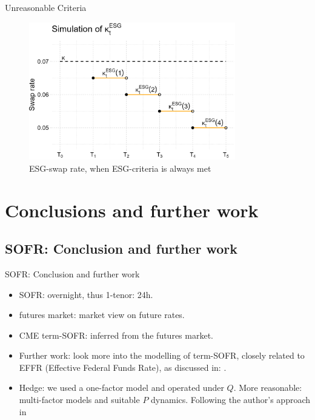 \documentclass[UKenglish]{beamer}
\begin{document}
\begin{frame}{Unreasonable Criteria}
\begin{figure}[htp]
    \centering
    \includegraphics[width= 9cm]{ESG/kappa_t_ESG_2.png}
    \caption{ESG-swap rate, when ESG-criteria is always met}
    \label{fig: ESG_swap_2}
\end{figure}
\end{frame}


\section{Conclusions and further work}
\SectionPage

\subsection{SOFR: Conclusion and further work}
\begin{frame}{SOFR: Conclusion and further work}
\begin{itemize}
    \item SOFR: overnight, thus 1-tenor: 24h. 
    \item futures market: market view on future rates. 
    \item CME term-SOFR: inferred from the futures market. 
    \item Further work: look more into the modelling of term-SOFR, closely related to EFFR (Effective Federal Funds Rate), as discussed in: \cite{gellert2021short}.  
    \item Hedge: we used a one-factor model and operated under $Q$. More reasonable: multi-factor models and suitable $ P$ dynamics. Following the author's approach in \cite{SS20} 
\end{itemize}
\end{frame}
\end{document}
